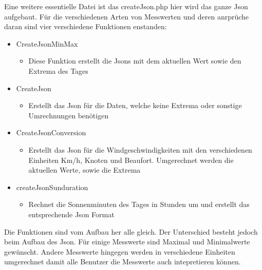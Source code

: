 Eine weitere essentielle Datei ist das createJson.php hier wird das ganze Json aufgebaut. Für die verschiedenen Arten von Messwerten und deren anrprüche daran sind vier verschiedene Funktionen enstanden:

\begin{itemize}
\item CreateJsonMinMax
\begin{itemize}
\item Diese Funktion erstellt die Jsons mit dem aktuellen Wert sowie den Extrema des Tages
\end{itemize}
\item CreateJson
\begin{itemize}
\item Erstellt das Json für die Daten, welche keine Extrema oder sonstige Umrechnungen benötigen
\end{itemize}
\item CreateJsonConversion
\begin{itemize}
\item Erstellt das Json für die Windgeschwindigkeiten mit den verschiedenen Einheiten Km/h, Knoten und Beaufort. Umgerechnet werden die aktuellen Werte, sowie die Extrema
\end{itemize}
\item createJsonSunduration
\begin{itemize}
\item Rechnet die Sonnenminuten des Tages in Stunden um und erstellt das entsprechende Json Format
\end{itemize}
\end{itemize}

Die Funktionen sind vom Aufbau her alle gleich. Der Unterschied besteht jedoch beim Aufbau des Json. Für einige Messwerte sind Maximal und Minimalwerte gewünscht. Andere Messwerte hingegen werden in verschiedene Einheiten umgerechnet damit alle Benutzer die Messwerte auch intepretieren können.